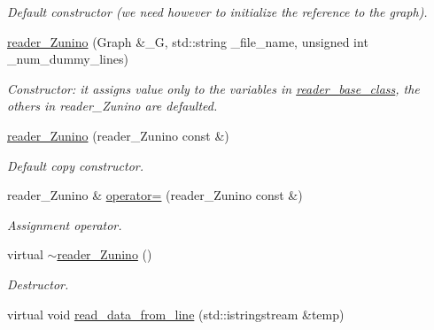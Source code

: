 \begin{DoxyCompactItemize}
\begin{DoxyCompactList}\small\item\em Default constructor (we need however to initialize the reference to the graph). \item\end{DoxyCompactList}\item 
\hypertarget{classfinal_a84f4dcb2212377341f0af39e2f156649}{
\hyperlink{classfinal_a84f4dcb2212377341f0af39e2f156649}{reader\_\-Zunino} (Graph \&\_\-G, std::string \_\-file\_\-name, unsigned int \_\-num\_\-dummy\_\-lines)}
\label{classfinal_a84f4dcb2212377341f0af39e2f156649}

\begin{DoxyCompactList}\small\item\em Constructor: it assigns value only to the variables in \hyperlink{classreader__base__class}{reader\_\-base\_\-class}, the others in reader\_\-Zunino are defaulted. \item\end{DoxyCompactList}\item 
\hypertarget{classfinal_a25f77215488a56ae4a22f51d64d32a6b}{
\hyperlink{classfinal_a25f77215488a56ae4a22f51d64d32a6b}{reader\_\-Zunino} (reader\_\-Zunino const \&)}
\label{classfinal_a25f77215488a56ae4a22f51d64d32a6b}

\begin{DoxyCompactList}\small\item\em Default copy constructor. \item\end{DoxyCompactList}\item 
\hypertarget{classfinal_aff2495d773e418a0e3f693e8914a5552}{
reader\_\-Zunino \& \hyperlink{classfinal_aff2495d773e418a0e3f693e8914a5552}{operator=} (reader\_\-Zunino const \&)}
\label{classfinal_aff2495d773e418a0e3f693e8914a5552}

\begin{DoxyCompactList}\small\item\em Assignment operator. \item\end{DoxyCompactList}\item 
\hypertarget{classfinal_a88e3b3e84bc102ca0fde5b4f1b809bcd}{
virtual \hyperlink{classfinal_a88e3b3e84bc102ca0fde5b4f1b809bcd}{$\sim$reader\_\-Zunino} ()}
\label{classfinal_a88e3b3e84bc102ca0fde5b4f1b809bcd}

\begin{DoxyCompactList}\small\item\em Destructor. \item\end{DoxyCompactList}\item 
\hypertarget{classfinal_a1a4095a2c11236175b4e29557704554c}{
virtual void \hyperlink{classfinal_a1a4095a2c11236175b4e29557704554c}{read\_\-data\_\-from\_\-line} (std::istringstream \&temp)}
\label{classfinal_a1a4095a2c11236175b4e29557704554c}


\end{DoxyCompactItemize}
